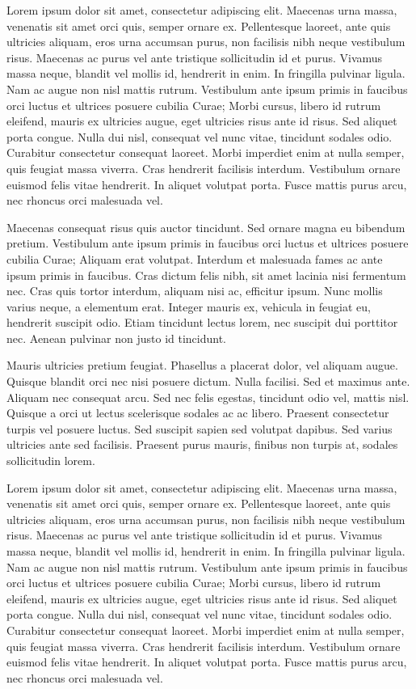 Lorem ipsum dolor sit amet, consectetur adipiscing elit. Maecenas urna massa, venenatis sit amet orci quis, semper ornare ex. Pellentesque laoreet, ante quis ultricies aliquam, eros urna accumsan purus, non facilisis nibh neque vestibulum risus. Maecenas ac purus vel ante tristique sollicitudin id et purus. Vivamus massa neque, blandit vel mollis id, hendrerit in enim. In fringilla pulvinar ligula. Nam ac augue non nisl mattis rutrum. Vestibulum ante ipsum primis in faucibus orci luctus et ultrices posuere cubilia Curae; Morbi cursus, libero id rutrum eleifend, mauris ex ultricies augue, eget ultricies risus ante id risus. Sed aliquet porta congue. Nulla dui nisl, consequat vel nunc vitae, tincidunt sodales odio. Curabitur consectetur consequat laoreet. Morbi imperdiet enim at nulla semper, quis feugiat massa viverra. Cras hendrerit facilisis interdum. Vestibulum ornare euismod felis vitae hendrerit. In aliquet volutpat porta. Fusce mattis purus arcu, nec rhoncus orci malesuada vel.

Maecenas consequat risus quis auctor tincidunt. Sed ornare magna eu bibendum pretium. Vestibulum ante ipsum primis in faucibus orci luctus et ultrices posuere cubilia Curae; Aliquam erat volutpat. Interdum et malesuada fames ac ante ipsum primis in faucibus. Cras dictum felis nibh, sit amet lacinia nisi fermentum nec. Cras quis tortor interdum, aliquam nisi ac, efficitur ipsum. Nunc mollis varius neque, a elementum erat. Integer mauris ex, vehicula in feugiat eu, hendrerit suscipit odio. Etiam tincidunt lectus lorem, nec suscipit dui porttitor nec. Aenean pulvinar non justo id tincidunt.

Mauris ultricies pretium feugiat. Phasellus a placerat dolor, vel aliquam augue. Quisque blandit orci nec nisi posuere dictum. Nulla facilisi. Sed et maximus ante. Aliquam nec consequat arcu. Sed nec felis egestas, tincidunt odio vel, mattis nisl. Quisque a orci ut lectus scelerisque sodales ac ac libero. Praesent consectetur turpis vel posuere luctus. Sed suscipit sapien sed volutpat dapibus. Sed varius ultricies ante sed facilisis. Praesent purus mauris, finibus non turpis at, sodales sollicitudin lorem. 

Lorem ipsum dolor sit amet, consectetur adipiscing elit. Maecenas urna massa, venenatis sit amet orci quis, semper ornare ex. Pellentesque laoreet, ante quis ultricies aliquam, eros urna accumsan purus, non facilisis nibh neque vestibulum risus. Maecenas ac purus vel ante tristique sollicitudin id et purus. Vivamus massa neque, blandit vel mollis id, hendrerit in enim. In fringilla pulvinar ligula. Nam ac augue non nisl mattis rutrum. Vestibulum ante ipsum primis in faucibus orci luctus et ultrices posuere cubilia Curae; Morbi cursus, libero id rutrum eleifend, mauris ex ultricies augue, eget ultricies risus ante id risus. Sed aliquet porta congue. Nulla dui nisl, consequat vel nunc vitae, tincidunt sodales odio. Curabitur consectetur consequat laoreet. Morbi imperdiet enim at nulla semper, quis feugiat massa viverra. Cras hendrerit facilisis interdum. Vestibulum ornare euismod felis vitae hendrerit. In aliquet volutpat porta. Fusce mattis purus arcu, nec rhoncus orci malesuada vel. 

